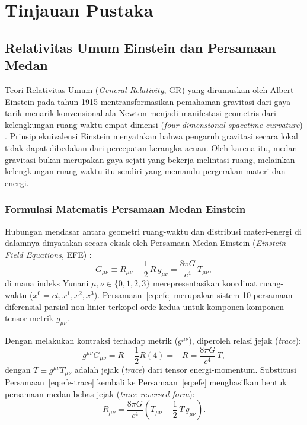 
\chapter{Tinjauan Pustaka}
\label{chap:tinjauan}

\section{Relativitas Umum Einstein dan Persamaan Medan}
\label{sec:relativitas-umum}

Teori Relativitas Umum (\textit{General Relativity}, GR) yang dirumuskan oleh Albert Einstein pada tahun 1915 mentransformasikan pemahaman gravitasi dari gaya tarik-menarik konvensional ala Newton menjadi manifestasi geometris dari kelengkungan ruang-waktu empat dimensi (\textit{four-dimensional spacetime curvature}) \parencite{Einstein1916GR}. Prinsip ekuivalensi Einstein menyatakan bahwa pengaruh gravitasi secara lokal tidak dapat dibedakan dari percepatan kerangka acuan. Oleh karena itu, medan gravitasi bukan merupakan gaya sejati yang bekerja melintasi ruang, melainkan kelengkungan ruang-waktu itu sendiri yang memandu pergerakan materi dan energi.

\subsection{Formulasi Matematis Persamaan Medan Einstein}
\label{subsec:efe-formulasi}

Hubungan mendasar antara geometri ruang-waktu dan distribusi materi-energi di dalamnya dinyatakan secara eksak oleh Persamaan Medan Einstein (\textit{Einstein Field Equations}, EFE) \parencite{Einstein1916GR}:
\begin{equation}
    G_{\mu\nu} \equiv R_{\mu\nu} - \frac{1}{2}\, R\, g_{\mu\nu} = \frac{8\pi G}{c^4}\, T_{\mu\nu},
    \label{eq:efe}
\end{equation}
di mana indeks Yunani $\mu, \nu \in \{0, 1, 2, 3\}$ merepresentasikan koordinat ruang-waktu ($x^0 = ct, x^1, x^2, x^3$). Persamaan~\eqref{eq:efe} merupakan sistem 10 persamaan diferensial parsial non-linier terkopel orde kedua untuk komponen-komponen tensor metrik $g_{\mu\nu}$.

Dengan melakukan kontraksi terhadap metrik ($g^{\mu\nu}$), diperoleh relasi jejak (\textit{trace}):
\begin{equation}
    g^{\mu\nu} G_{\mu\nu} = R - \frac{1}{2} R (4) = -R = \frac{8\pi G}{c^4}\, T,
    \label{eq:efe-trace}
\end{equation}
dengan $T \equiv g^{\mu\nu}T_{\mu\nu}$ adalah jejak (\textit{trace}) dari tensor energi-momentum. Substitusi Persamaan~\eqref{eq:efe-trace} kembali ke Persamaan~\eqref{eq:efe} menghasilkan bentuk persamaan medan bebas-jejak (\textit{trace-reversed form}):
\begin{equation}
    R_{\mu\nu} = \frac{8\pi G}{c^4}\left( T_{\mu\nu} - \frac{1}{2}\, T\, g_{\mu\nu} \right).
    \label{eq:efe-trace-reversed}
\end{equation}

